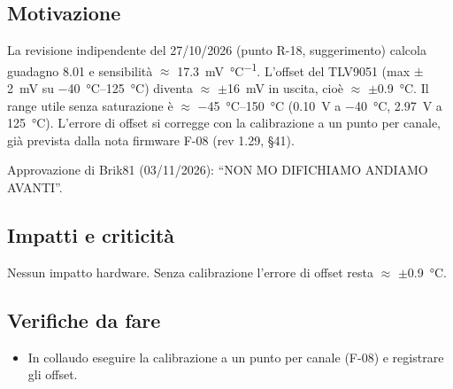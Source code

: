 \subsection{Motivazione}
La revisione indipendente del 27/10/2026 (punto R-18, suggerimento) calcola guadagno \num{8,01} e sensibilità $\approx$ \SI{17,3}{\milli\volt\per\celsius}. L'offset del TLV9051 (max $\pm$\SI{2}{\milli\volt} su \SIrange{-40}{125}{\celsius}) diventa $\approx$ $\pm$\SI{16}{\milli\volt} in uscita, cioè $\approx$ $\pm$\SI{0,9}{\celsius}. Il range utile senza saturazione è $\approx$ \SIrange{-45}{150}{\celsius} (\SI{0,10}{\volt} a \SI{-40}{\celsius}, \SI{2,97}{\volt} a \SI{+125}{\celsius}). L'errore di offset si corregge con la calibrazione a un punto per canale, già prevista dalla nota firmware F-08 (rev 1.29, §41).

Approvazione di Brik81 (03/11/2026): \textquotedblleft{}NON MO DIFICHIAMO ANDIAMO AVANTI\textquotedblright{}.

\subsection{Impatti e criticità}
\begin{notebox}
Nessun impatto hardware. Senza calibrazione l'errore di offset resta $\approx$ $\pm$\SI{0,9}{\celsius}.
\end{notebox}

\subsection{Verifiche da fare}
\begin{itemize}
\item In collaudo eseguire la calibrazione a un punto per canale (F-08) e registrare gli offset.
\end{itemize}
